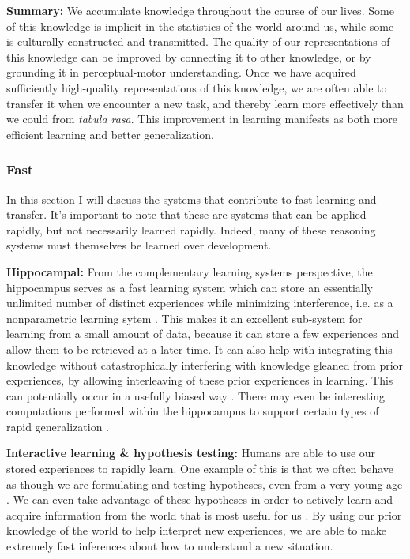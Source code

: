 \documentclass[11pt]{article}
\begin{document}
\textbf{Summary:} We accumulate knowledge throughout the course of our lives. Some of this knowledge is implicit in the statistics of the world around us, while some is culturally constructed and transmitted. The quality of our representations of this knowledge can be improved by connecting it to other knowledge, or by grounding it in perceptual-motor understanding. Once we have acquired sufficiently high-quality representations of this knowledge, we are often able to transfer it when we encounter a new task, and thereby learn more effectively than we could from \textit{tabula rasa}. This improvement in learning manifests as both more efficient learning and better generalization. \par

\subsubsection{Fast}
In this section I will discuss the systems that contribute to fast learning and transfer. It's important to note that these are systems that can be applied rapidly, but not necessarily learned rapidly. Indeed, many of these reasoning systems must themselves be learned over development. \par
\textbf{Hippocampal:} From the complementary learning systems perspective, the hippocampus serves as a fast learning system which can store an essentially unlimited number of distinct experiences while minimizing interference, i.e. as a nonparametric learning sytem \citep{Kumaran2016}. This makes it an excellent sub-system for learning from a small amount of data, because it can store a few experiences and allow them to be retrieved at a later time. It can also help with integrating this knowledge without catastrophically interfering \citep{McCloskey1989} with knowledge gleaned from prior experiences, by allowing interleaving of these prior experiences in learning. This can potentially occur in a usefully biased way \citep{Kumaran2016}. There may even be interesting computations performed within the hippocampus to support certain types of rapid generalization \citep{Kumaran2012}. \par 
\textbf{Interactive learning \& hypothesis testing:} Humans are able to use our stored experiences to rapidly learn. One example of this is that we often behave as though we are formulating and testing hypotheses, even from a very young age \citep{Sobel2004, Gopnik2014}. We can even take advantage of these hypotheses in order to actively learn and acquire information from the world that is most useful for us \citep[e.g.]{Markant2014a}. By using our prior knowledge of the world to help interpret new experiences, we are able to make extremely fast inferences about how to understand a new situation. \par
\end{document}
